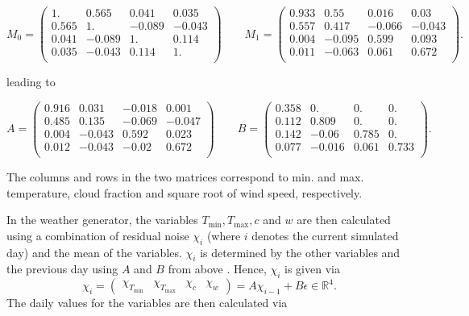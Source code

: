 \begin{refsection}
\begin{equation}
M_0 = \left( \begin{matrix}
1. & 0.565 & 0.041 & 0.035\\
0.565 & 1. & -0.089 & -0.043\\
0.041 & -0.089 & 1. & 0.114\\
0.035 & -0.043 & 0.114 & 1.\\
\end{matrix} \right)
\qquad
M_1 = \left( \begin{matrix}
0.933 & 0.55 & 0.016 & 0.03\\
0.557 & 0.417 & -0.066 & -0.043\\
0.004 & -0.095 & 0.599 & 0.093\\
0.011 & -0.063 & 0.061 & 0.672\\
\end{matrix} \right).
\end{equation}

leading to

\begin{equation}
A = \left( \begin{matrix}
0.916 & 0.031 & -0.018 & 0.001\\
0.485 & 0.135 & -0.069 & -0.047\\
0.004 & -0.043 & 0.592 & 0.023\\
0.012 & -0.043 & -0.02 & 0.672\\
\end{matrix} \right)
\qquad
B = \left( \begin{matrix}
0.358 & 0. & 0. & 0.\\
0.112 & 0.809 & 0. & 0.\\
0.142 & -0.06 & 0.785 & 0.\\
0.077 & -0.016 & 0.061 & 0.733\\
\end{matrix} \right) \label{eq:AB}.
\end{equation}

The columns and rows in the two matrices correspond to min. and max. temperature, cloud fraction and square root of wind speed, respectively.

In the weather generator, the variables $T_\mathrm{min}, T_\mathrm{max}, c$ and $w$ are then calculated using a combination of residual noise $\chi_i$ (where $i$ denotes the current simulated day) and the mean of the variables. $\chi_i$ is determined by the other variables and the previous day using $A$ and $B$ from above \citep{Richardson1981,Matalas1967}. Hence, $\chi_i$ is given via
\begin{equation}
\chi_i = 
\begin{pmatrix} 
\chi_{T_\mathrm{min}} & \chi_{T_\mathrm{max}} & \chi_c & \chi_w
\end{pmatrix} = A\chi_{i-1} + B\epsilon \in \mathbb{R}^4.
\end{equation}
The daily values for the variables are then calculated via


\end{refsection}
